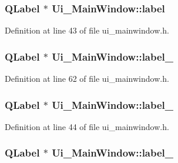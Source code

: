 \subsubsection[{\texorpdfstring{label}{label}}]{\setlength{\rightskip}{0pt plus 5cm}Q\+Label $\ast$ Ui\+\_\+\+Main\+Window\+::label}\hypertarget{class_ui___main_window_a78edcdd12ea78c06d7e80f322c8882f9}{}\label{class_ui___main_window_a78edcdd12ea78c06d7e80f322c8882f9}


Definition at line 43 of file ui\+\_\+mainwindow.\+h.

\subsubsection[{\texorpdfstring{label\+\_\+10}{label_10}}]{\setlength{\rightskip}{0pt plus 5cm}Q\+Label $\ast$ Ui\+\_\+\+Main\+Window\+::label\+\_}\hypertarget{class_ui___main_window_a0130582ecf8dfbf621aa87f6d0d702f7}{}\label{class_ui___main_window_a0130582ecf8dfbf621aa87f6d0d702f7}


Definition at line 62 of file ui\+\_\+mainwindow.\+h.

\subsubsection[{\texorpdfstring{label\+\_\+2}{label_2}}]{\setlength{\rightskip}{0pt plus 5cm}Q\+Label $\ast$ Ui\+\_\+\+Main\+Window\+::label\+\_}\hypertarget{class_ui___main_window_a2f5576686ce98bcc41bd1b1eca07e56a}{}\label{class_ui___main_window_a2f5576686ce98bcc41bd1b1eca07e56a}


Definition at line 44 of file ui\+\_\+mainwindow.\+h.

\subsubsection[{\texorpdfstring{label\+\_\+3}{label_3}}]{\setlength{\rightskip}{0pt plus 5cm}Q\+Label $\ast$ Ui\+\_\+\+Main\+Window\+::label\+\_}\hypertarget{class_ui___main_window_a253fbc5b44941384321b7c58cf96cc65}{}\label{class_ui___main_window_a253fbc5b44941384321b7c58cf96cc65}


